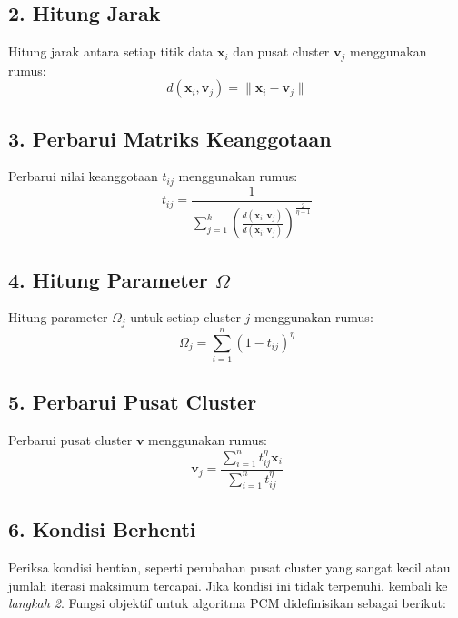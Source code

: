 \documentclass[
  oneside]{book}
\begin{document}
\subsection*{2. Hitung Jarak}\label{hitung-jarak}

Hitung jarak antara setiap titik data \(\mathbf{x}_i\) dan pusat cluster \(\mathbf{v}_j\) menggunakan rumus:
\[
   d(\mathbf{x}_i, \mathbf{v}_j) = \| \mathbf{x}_i - \mathbf{v}_j \|
   \]

\subsection*{3. Perbarui Matriks Keanggotaan}\label{perbarui-matriks-keanggotaan-1}

Perbarui nilai keanggotaan \(t_{ij}\) menggunakan rumus:
\[
   t_{ij} = \frac{1}{\sum_{j=1}^{k} \left( \frac{d(\mathbf{x}_i, \mathbf{v}_j)}{d(\mathbf{x}_i, \mathbf{v}_j)} \right)^{\frac{2}{\eta - 1}}}
   \]

\subsection*{\texorpdfstring{4. Hitung Parameter \(\Omega\)}{4. Hitung Parameter \textbackslash Omega}}\label{hitung-parameter-omega}

Hitung parameter \(\Omega_j\) untuk setiap cluster \(j\) menggunakan rumus:
\[
   \Omega_j = \sum_{i=1}^{n} (1 - t_{ij})^\eta
   \]

\subsection*{5. Perbarui Pusat Cluster}\label{perbarui-pusat-cluster}

Perbarui pusat cluster \(\mathbf{v}\) menggunakan rumus:
\[
   \mathbf{v}_j = \frac{\sum_{i=1}^{n} t_{ij}^\eta \mathbf{x}_i}{\sum_{i=1}^{n} t_{ij}^\eta}
   \]

\subsection*{6. Kondisi Berhenti}\label{kondisi-berhenti-1}

Periksa kondisi hentian, seperti perubahan pusat cluster yang sangat kecil atau jumlah iterasi maksimum tercapai. Jika kondisi ini tidak terpenuhi, kembali ke \emph{langkah 2}. Fungsi objektif untuk algoritma PCM didefinisikan sebagai berikut:
\end{document}
